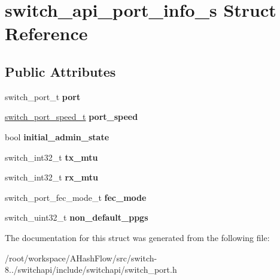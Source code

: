 \hypertarget{structswitch__api__port__info__s}{\section{switch\+\_\+api\+\_\+port\+\_\+info\+\_\+s Struct Reference}
\label{structswitch__api__port__info__s}
}
\subsection*{Public Attributes}
\begin{DoxyCompactItemize}
\item 
\hypertarget{structswitch__api__port__info__s_addc46c5fb3fb71d1cc5df294f3e7530b}{switch\+\_\+port\+\_\+t {\bfseries port}}\label{structswitch__api__port__info__s_addc46c5fb3fb71d1cc5df294f3e7530b}

\item 
\hypertarget{structswitch__api__port__info__s_a46e3fa81811bd2b6499d2cb01765805b}{\hyperlink{group__Port_ga29ae043889998625e4f817091229005c}{switch\+\_\+port\+\_\+speed\+\_\+t} {\bfseries port\+\_\+speed}}\label{structswitch__api__port__info__s_a46e3fa81811bd2b6499d2cb01765805b}

\item 
\hypertarget{structswitch__api__port__info__s_a68982ded1f62b7de00c9f8aa67404e4e}{bool {\bfseries initial\+\_\+admin\+\_\+state}}\label{structswitch__api__port__info__s_a68982ded1f62b7de00c9f8aa67404e4e}

\item 
\hypertarget{structswitch__api__port__info__s_a95fccf667e63d3117806f067901993d5}{switch\+\_\+int32\+\_\+t {\bfseries tx\+\_\+mtu}}\label{structswitch__api__port__info__s_a95fccf667e63d3117806f067901993d5}

\item 
\hypertarget{structswitch__api__port__info__s_ac254769d4abf98e5a8f8f8551218fa76}{switch\+\_\+int32\+\_\+t {\bfseries rx\+\_\+mtu}}\label{structswitch__api__port__info__s_ac254769d4abf98e5a8f8f8551218fa76}

\item 
\hypertarget{structswitch__api__port__info__s_a7fc297bea9fd07d43ac15c32ece9bbf0}{switch\+\_\+port\+\_\+fec\+\_\+mode\+\_\+t {\bfseries fec\+\_\+mode}}\label{structswitch__api__port__info__s_a7fc297bea9fd07d43ac15c32ece9bbf0}

\item 
\hypertarget{structswitch__api__port__info__s_a90119ad944784a28ce444904aafc583d}{switch\+\_\+uint32\+\_\+t {\bfseries non\+\_\+default\+\_\+ppgs}}\label{structswitch__api__port__info__s_a90119ad944784a28ce444904aafc583d}

\end{DoxyCompactItemize}


The documentation for this struct was generated from the following file\+:\begin{DoxyCompactItemize}
\item 
/root/workspace/\+A\+Hash\+Flow/src/switch-\/8../switchapi/include/switchapi/switch\+\_\+port.\+h\end{DoxyCompactItemize}
